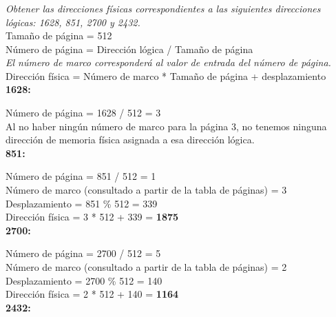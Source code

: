 \documentclass[spanish]{article}
\begin{document}
\newpage

\subsubsection{}

\textit{Obtener las direcciones físicas correspondientes a
las siguientes direcciones lógicas: 1628, 851, 2700 y
2432.}\\

Tamaño de página = 512\\

Número de página = Dirección lógica / Tamaño de página\\

\textit{El número de marco corresponderá al valor de entrada
del número de página.}\\

Dirección física = Número de marco * Tamaño de página +
desplazamiento\\

\textbf{1628:}

Número de página = 1628 / 512 = 3\\

Al no haber ningún número de marco para la página 3, no
tenemos ninguna dirección de memoria física asignada a esa
dirección lógica.\\

\textbf{851:}

Número de página = 851 / 512 = 1\\

Número de marco (consultado a partir de la tabla de páginas)
= 3\\

Desplazamiento = 851 \% 512 = 339\\

Dirección física = 3 * 512 + 339 = \textbf{1875}\\

\textbf{2700:}

Número de página = 2700 / 512 = 5\\

Número de marco (consultado a partir de la tabla de páginas)
= 2\\

Desplazamiento = 2700 \% 512 = 140\\

Dirección física = 2 * 512 + 140 = \textbf{1164}\\

\textbf{2432:}
\end{document}
